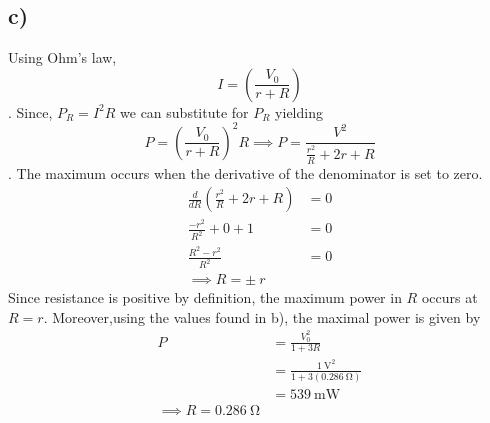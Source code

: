 \documentclass[
	12pt,
	]{article}
\theoremstyle{definition}
\theoremstyle{definition}
\theoremstyle{definition}
\theoremstyle{definition}
\theoremstyle{definition}
\theoremstyle{example}
\theoremstyle{note}
\theoremstyle{remark}
\theoremstyle{example}
\begin{document}
		  	 \subsection{c) }
		  	 	Using Ohm's law, 
		  	 	$$ I = \left(\frac{V_{0}}{r+R}\right)$$.
		  	 	Since, $P_{R} = I^{2}R $ we can substitute for $P_{R}$ yielding 
		  	 	$$ P = \left(\frac{V_{0}}{r+R}\right)^{2} R \implies P = \frac{V^{2}}{\frac{r^{2}}{R} + 2r + R}$$.
		  	 	The maximum occurs when the derivative of the denominator is set to zero.
		  	 	\begin{align*}
		  	 		\frac{d}{d R}\left(\frac{r^{2}}{R} + 2r + R\right) &= 0 \\
		  	 	    \frac{-r^{2}}{R^{2}} + 0 + 1 &= 0  \\
		  	 		\frac{R^{2} - r^{2}}{R^{2}} &= 0 \\
		  	 		\implies R = \pm \ r
		  	 	\end{align*} 
		  	 	Since resistance is positive by definition, the maximum power in $R$ occurs at $ R = r$. Moreover,using the values found in b), the maximal power is given by
		  	 	\begin{align*}
		  	 	P &=\frac{V_{0}^{2}}{1+3R} \\
		  	 	&= \frac{{1 \ \si{\volt}}^{2}}{1 + 3(0.286 \ \si{\ohm}) } \\
		  	 	& = 539 \ \si{\milli\watt} \\
		  	 	\implies R = 0.286 \ \si{\ohm}
		  	 	\end{align*}
\end{document}
